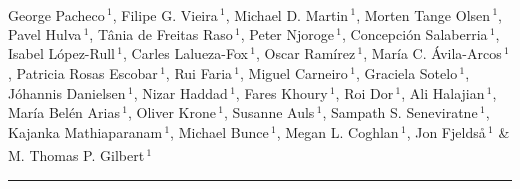 \documentclass[twoside, british, a4paper]{article}
\newcommand\myhline{%
  \noindent\rule[.5pt]{\linewidth}{.4pt}\par%
}
\begin{document}
\thispagestyle{empty}


\LARGE{\bfseries{\color[rgb]{0.25,0.25,0.25}}} \\

 \small \noindent 
George Pacheco\,$^{1}$\textsuperscript{\faEnvelopeO},
Filipe G. Vieira\,$^{1}$,
Michael D. Martin\,$^{1}$,
Morten Tange Olsen\,$^{1}$,
Pavel Hulva\,$^{1}$,
Tânia de Freitas Raso\,$^{1}$,
Peter Njoroge\,$^{1}$,
Concepción Salaberria\,$^{1}$,
Isabel López-Rull\,$^{1}$,
Carles Lalueza-Fox\,$^{1}$,
Oscar Ramírez\,$^{1}$,
María C. Ávila-Arcos\,$^{1}$,
Patricia Rosas Escobar\,$^{1}$,
Rui Faria\,$^{1}$,
Miguel Carneiro\,$^{1}$,
Graciela Sotelo\,$^{1}$,
Jóhannis Danielsen\,$^{1}$,
Nizar Haddad\,$^{1}$,
Fares Khoury\,$^{1}$,
Roi Dor\,$^{1}$,
Ali Halajian\,$^{1}$,
María Belén Arias\,$^{1}$,
Oliver Krone\,$^{1}$,
Susanne Auls\,$^{1}$,
Sampath S. Seneviratne\,$^{1}$,
Kajanka Mathiaparanam\,$^{1}$,
Michael Bunce\,$^{1}$,
Megan L. Coghlan\,$^{1}$,
Jon Fjeldså\,$^{1}$ \&
M. Thomas P. Gilbert\,$^{1}$\textsuperscript{\faEnvelopeO} \\
\myhline
\end{document}
